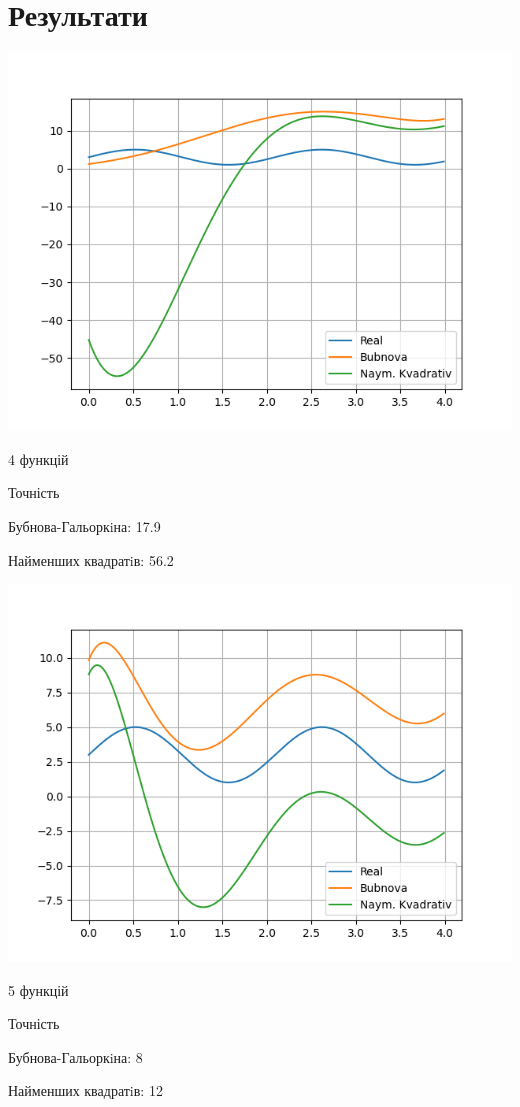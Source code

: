 \chapter{Результати}




\begin{minipage}{0.5\textwidth}
    \includegraphics[scale=0.5]{4.png}
\end{minipage}%
\begin{minipage}{0.5\textwidth}
4 функцій


Точність


Бубнова-Гальоркiна:  17.9


Найменших квадратiв:  56.2

\end{minipage}%

\begin{minipage}{0.5\textwidth}
    \includegraphics[scale=0.5]{5.png}
\end{minipage}%
\begin{minipage}{0.5\textwidth}
5 функцій


Точність


Бубнова-Гальоркiна:  8


Найменших квадратiв:  12

\end{minipage}%

